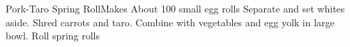 \documentclass[]{article}
\title{}
\author{}
\begin{document}
\begin{recipe}{Pork-Taro Spring Roll}{}{Makes About 100 small egg rolls}
	Separate and set whites aside. 
	Shred carrots and taro. 
	Combine with vegetables and egg yolk in large bowl.
	Roll spring rolls
\end{recipe}
\end{document}
